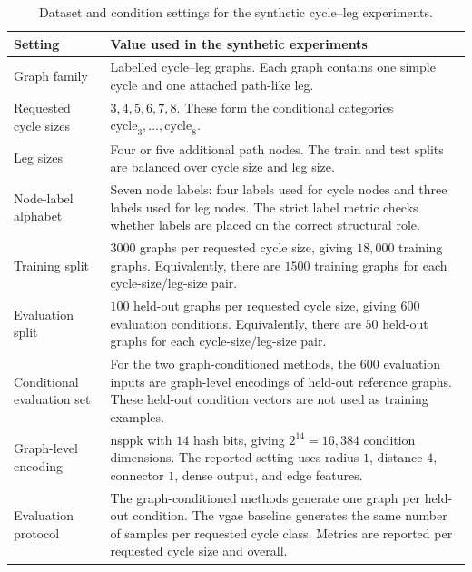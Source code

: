 \begin{table}[p]
\centering
\footnotesize
\begin{tabularx}{\textwidth}{@{}p{}X@{}}
\toprule
Setting & Value used in the synthetic experiments \\
\midrule
Graph family & Labelled cycle--leg graphs. Each graph contains one simple cycle and one attached path-like leg. \\
Requested cycle sizes & \(3,4,5,6,7,8\). These form the conditional categories \(\mathrm{cycle}_3,\ldots,\mathrm{cycle}_8\). \\
Leg sizes & Four or five additional path nodes. The train and test splits are balanced over cycle size and leg size. \\
Node-label alphabet & Seven node labels: four labels used for cycle nodes and three labels used for leg nodes. The strict label metric checks whether labels are placed on the correct structural role. \\
Training split & \(3000\) graphs per requested cycle size, giving \(18{,}000\) training graphs. Equivalently, there are \(1500\) training graphs for each cycle-size/leg-size pair. \\
Evaluation split & \(100\) held-out graphs per requested cycle size, giving \(600\) evaluation conditions. Equivalently, there are \(50\) held-out graphs for each cycle-size/leg-size pair. \\
Conditional evaluation set & For the two graph-conditioned methods, the \(600\) evaluation inputs are graph-level encodings of held-out reference graphs. These held-out condition vectors are not used as training examples. \\
Graph-level encoding & \gls{nsppk} with \(14\) hash bits, giving \(2^{14}=16{,}384\) condition dimensions. The reported setting uses radius \(1\), distance \(4\), connector \(1\), dense output, and edge features. \\
Evaluation protocol & The graph-conditioned methods generate one graph per held-out condition. The \gls{vgae} baseline generates the same number of samples per requested cycle class. Metrics are reported per requested cycle size and overall. \\
\bottomrule
\end{tabularx}
\caption{Dataset and condition settings for the synthetic cycle--leg experiments.}
\label{tab:synthetic-cycle-leg-settings}
\end{table}

